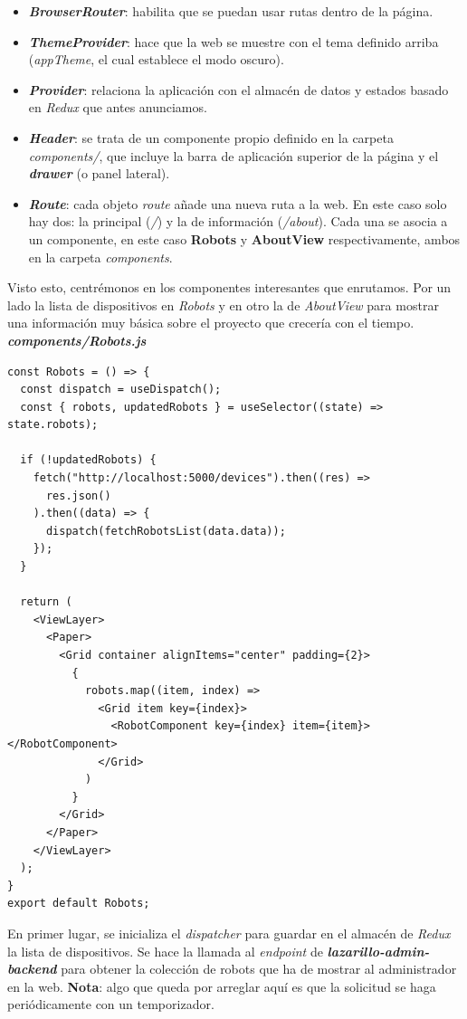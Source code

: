 \begin{itemize}
	\item \textbf{\textit{BrowserRouter}}: habilita que se puedan usar rutas dentro de la página.
	\item \textbf{\textit{ThemeProvider}}: hace que la web se muestre con el tema definido arriba (\textit{appTheme}, el cual establece el modo oscuro).
	\item \textbf{\textit{Provider}}: relaciona la aplicación con el almacén de datos y estados basado en \textit{Redux} que antes anunciamos.
	\item \textbf{\textit{Header}}: se trata de un componente propio definido en la carpeta \textit{components/}, que incluye la barra de aplicación superior de la página y el \textbf{\textit{drawer}} (o panel lateral).
	\item \textbf{\textit{Route}}: cada objeto \textit{route} añade una nueva ruta a la web. En este caso solo hay dos: la principal (\emph{/}) y la de información (\emph{/about}). Cada una se asocia a un componente, en este caso \textbf{Robots} y \textbf{AboutView} respectivamente, ambos en la carpeta \textit{components}.
\end{itemize}

Visto esto, centrémonos en los componentes interesantes que enrutamos. Por un lado la lista de dispositivos en \textit{Robots} y en otro la de \textit{AboutView} para mostrar una información muy básica sobre el proyecto que crecería con el tiempo.\\

\textbf{\textit{components/Robots.js}}
\begin{lstlisting}
const Robots = () => {
  const dispatch = useDispatch();
  const { robots, updatedRobots } = useSelector((state) => state.robots);

  if (!updatedRobots) {
    fetch("http://localhost:5000/devices").then((res) =>
      res.json()
    ).then((data) => {
      dispatch(fetchRobotsList(data.data));
    });
  }

  return (
    <ViewLayer>
      <Paper>
        <Grid container alignItems="center" padding={2}>
          {
            robots.map((item, index) =>
              <Grid item key={index}>
                <RobotComponent key={index} item={item}></RobotComponent>
              </Grid>
            )
          }
        </Grid>
      </Paper>
    </ViewLayer>
  );
}
export default Robots;
\end{lstlisting}

En primer lugar, se inicializa el \textit{dispatcher} para guardar en el almacén de \textit{Redux} la lista de dispositivos. Se hace la llamada al \textit{endpoint} de \textbf{\textit{lazarillo-admin-backend}} para obtener la colección de robots que ha de mostrar al administrador en la web. \textbf{Nota}: algo que queda por arreglar aquí es que la solicitud se haga periódicamente con un temporizador.\\

